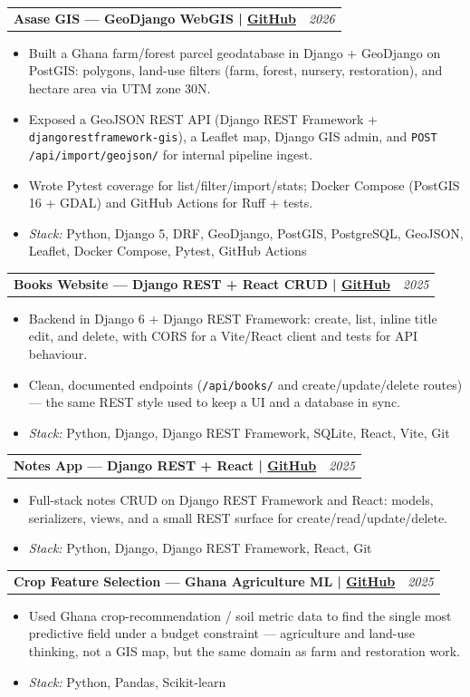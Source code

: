 \documentclass[letterpaper,11pt]{article}
\makeatletter
\newcommand{\resumeItem}[1]{\item\small{#1\vspace{-1pt}}}
\newcommand{\resumeProjectHeading}[2]{%
  \vspace{-2pt}\item
  \begin{tabular*}{1.0\textwidth}[t]{l@{\extracolsep{\fill}}r}
    \textbf{#1} & \textit{\small #2} \\
  \end{tabular*}\vspace{-7pt}
}
\newcommand{\resumeItemListStart}{\begin{itemize}[leftmargin=0.15in]}
\newcommand{\resumeItemListEnd}{\end{itemize}\vspace{-5pt}}
\makeatother
\begin{document}
  \resumeProjectHeading
    {Asase GIS --- GeoDjango WebGIS \textnormal{|} \href{https://github.com/GeekKwame/asase-gis}{\small GitHub}}{2026}
  \resumeItemListStart
    \resumeItem{Built a Ghana farm/forest parcel geodatabase in Django + GeoDjango on PostGIS: polygons, land-use filters (farm, forest, nursery, restoration), and hectare area via UTM zone 30N.}
    \resumeItem{Exposed a GeoJSON REST API (Django REST Framework + \texttt{djangorestframework-gis}), a Leaflet map, Django GIS admin, and \texttt{POST /api/import/geojson/} for internal pipeline ingest.}
    \resumeItem{Wrote Pytest coverage for list/filter/import/stats; Docker Compose (PostGIS 16 + GDAL) and GitHub Actions for Ruff + tests.}
    \resumeItem{\textit{Stack:} Python, Django 5, DRF, GeoDjango, PostGIS, PostgreSQL, GeoJSON, Leaflet, Docker Compose, Pytest, GitHub Actions}
  \resumeItemListEnd

  \resumeProjectHeading
    {Books Website --- Django REST + React CRUD \textnormal{|} \href{https://github.com/GeekKwame/books-website}{\small GitHub}}{2025}
  \resumeItemListStart
    \resumeItem{Backend in Django 6 + Django REST Framework: create, list, inline title edit, and delete, with CORS for a Vite/React client and tests for API behaviour.}
    \resumeItem{Clean, documented endpoints (\texttt{/api/books/} and create/update/delete routes) --- the same REST style used to keep a UI and a database in sync.}
    \resumeItem{\textit{Stack:} Python, Django, Django REST Framework, SQLite, React, Vite, Git}
  \resumeItemListEnd

  \resumeProjectHeading
    {Notes App --- Django REST + React \textnormal{|} \href{https://github.com/GeekKwame/notes-app}{\small GitHub}}{2025}
  \resumeItemListStart
    \resumeItem{Full-stack notes CRUD on Django REST Framework and React: models, serializers, views, and a small REST surface for create/read/update/delete.}
    \resumeItem{\textit{Stack:} Python, Django, Django REST Framework, React, Git}
  \resumeItemListEnd

  \resumeProjectHeading
    {Crop Feature Selection --- Ghana Agriculture ML \textnormal{|} \href{https://github.com/GeekKwame/crop-feature-selection-ml}{\small GitHub}}{2025}
  \resumeItemListStart
    \resumeItem{Used Ghana crop-recommendation / soil metric data to find the single most predictive field under a budget constraint --- agriculture and land-use thinking, not a GIS map, but the same domain as farm and restoration work.}
    \resumeItem{\textit{Stack:} Python, Pandas, Scikit-learn}
  \resumeItemListEnd
\end{document}
